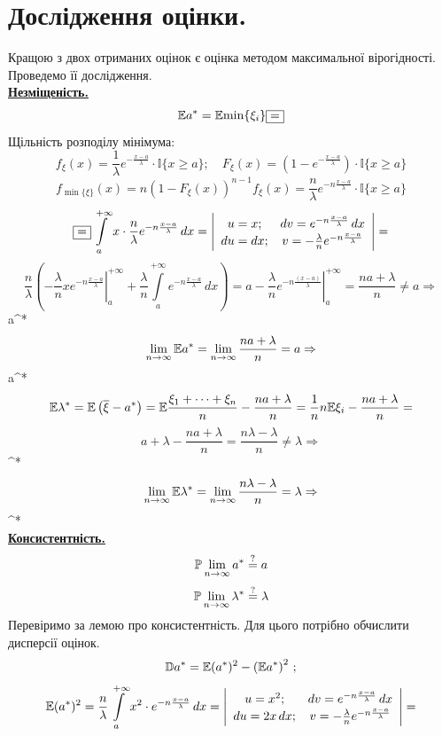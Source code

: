 \documentclass[14pt,a4paper]{scrartcl}
\begin{document}
\newpage
\section{Дослідження оцінки.}

Кращою з двох отриманих оцінок є оцінка методом максимальної вірогідності. Проведемо її дослідження.\\
\underline{\textbf{Незміщеність.}}\\
$$\E {a^*}=\E {\min\{\xi_i\}}\fbox{$=$}$$
Щільність розподілу мінімума:
$$f_\xi(x)=\frac1\lambda e^{-\frac{x-a}\lambda}\cdot\mathbb{I}\{x\geq a\};\quad
F_\xi(x)=(1-e^{-\frac{x-a}\lambda})\cdot\mathbb{I}\{x\geq a\}$$
$$f_{\min\{\xi\}}(x)=n(1-F_\xi(x))^{n-1}f_\xi(x)=
\frac{n}\lambda e^{-n\frac{x-a}{\lambda}}\cdot\mathbb{I}\{x\geq a\}$$
$$\fbox{$=$}\int\limits_{a}^{+\infty}{x\cdot\frac{n}\lambda e^{-n\frac{x-a}{\lambda}}\,dx}=
\left|\begin{array}{cc}
  u=x; & dv=e^{-n\frac{x-a}{\lambda}}\,dx\\
  du=dx; & v=-\frac{\lambda}{n}e^{-n\frac{x-a}{\lambda}}
\end{array}\right|=$$
$$\frac{n}{\lambda}\left(\left.-\frac{\lambda}{n}xe^{-n\frac{x-a}{\lambda}}\right|_a^{+\infty}+\frac{\lambda}{n}\int\limits_{a}^{+\infty}{e^{-n\frac{x-a}{\lambda}}\,dx}\right)=
a-\left.\frac{\lambda}{n}e^{-n\frac{(x-a)}{\lambda}}\right|_a^{+\infty}=
\frac{na+\lambda}n\ne a\Rightarrow$$
\be\Rightarrow a^*\ee
$$\lim\limits_{n\to\infty}{\E a^*}=\lim\limits_{n\to\infty}{\frac{na+\lambda}n}=a\Rightarrow$$
\be\Rightarrow a^*\ee
\\
$$\E \lambda^*=\E \left(\overline{\xi}-a^*\right)=
\E \frac{\xi_1+\dots+\xi_n}n-\frac{na+\lambda}n=
\frac1nn\E \xi_i-\frac{na+\lambda}n=$$
$$a+\lambda-\frac{na+\lambda}n=\frac{n\lambda-\lambda}n\ne\lambda\Rightarrow$$
\be\Rightarrow\lambda^*\ee
$$\lim\limits_{n\to\infty}{\E \lambda^*}=\lim\limits_{n\to\infty}{\frac{n\lambda-\lambda}n}=\lambda\Rightarrow$$
\be\Rightarrow\lambda^*\ee
\newpage\\
\underline{\textbf{Консистентність.}}
$$\P \lim\limits_{n\to\infty}{a^*}\stackrel{?}{=}a$$
$$\P \lim\limits_{n\to\infty}{\lambda^*}\stackrel{?}{=}\lambda$$
Перевіримо за лемою про консистентність. Для цього потрібно обчислити дисперсії оцінок.
$$\D a^*=\E (a^*)^2-\left(\E a^*\right)^2\,;$$
$$\E (a^*)^2=\frac{n}\lambda\int\limits_{a}^{+\infty}{x^2\cdot e^{-n\frac{x-a}\lambda}\,dx}=
\left|\begin{array}{cc}
  u=x^2; & dv=e^{-n\frac{x-a}\lambda}\,dx\\
  du=2x\,dx; & v=-\frac\lambda{n}e^{-n\frac{x-a}\lambda}
\end{array}\right|=$$
\end{document}
